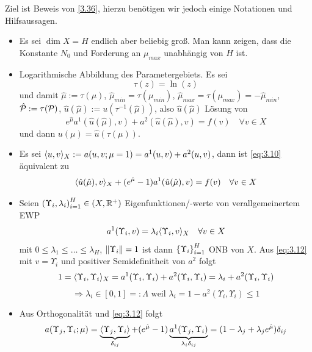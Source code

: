 Ziel ist Beweis von \ref{3.36}, hierzu benötigen wir jedoch einige Notationen und Hilfsaussagen.

\begin{itemize}
	\item Es sei $\dim X = H$ endlich aber beliebig groß.
		Man kann zeigen, dass die Konstante $N_0$ und Forderung an $\mu_{max}$ unabhängig von $H$ ist.
	\item Logarithmische Abbildung des Parametergebiets.
		Es sei
		\[
			\tau(z) = \ln(z)
		\]
		und damit $\hat\mu := \tau(\mu)$, $\hat\mu_{min} = \tau(\mu_{min})$, $\hat\mu_{max} = \tau(\mu_{max}) = -\hat\mu_{min}$, $\hat{\mathcal{P}} := \tau(\mathcal{P})$, $\hat u(\hat\mu) := u(\tau^{-1}(\hat\mu))$, also $\hat u(\hat\mu)$ Lösung von
		\begin{equation}
			e^{\hat\mu} a^1(\hat u(\hat\mu), v) + a^2(\hat u(\hat\mu), v) = f(v) \quad \forall v \in X \label{eq:3.10}
		\end{equation}
		und dann $u(\mu) = \hat u(\tau(\mu))$.
	\item Es sei $\langle u, v \rangle_X := a(u,v;\mu=1) = a^1(u,v) + a^2(u,v)$, dann ist \eqref{eq:3.10} äquivalent zu
		\begin{equation}
			\langle \hat u(\hat\mu), v \rangle_X + (e^{\hat\mu}-1) a^1(\hat u(\hat\mu),v) = f(v) \quad \forall v \in X \label{eq:3.11}
		\end{equation}
	\item Seien $\left(\Upsilon_i, \lambda_i\right)_{i=1}^H \in (X, \mathbb{R}^+)$ Eigenfunktionen/-werte von verallgemeinertem EWP
		\begin{equation}
			a^1(\Upsilon_i,v) = \lambda_i \langle \Upsilon_i, v \rangle_X \quad \forall v \in X \label{eq:3.12}
		\end{equation}
		mit $0 \leq \lambda_1 \leq \dots \leq \lambda_H$, $\|\Upsilon_i\| = 1$ ist dann $\left\{\Upsilon_i\right\}_{i=1}^H$ ONB von $X$.
		Aus \eqref{eq:3.12} mit $v = \Upsilon_i$ und positiver Semidefinitheit von $a^2$ folgt
		\[
			1 = \langle \Upsilon_i, \Upsilon_i \rangle_X = a^1(\Upsilon_i,\Upsilon_i) + a^2(\Upsilon_i,\Upsilon_i) = \lambda_i + a^2(\Upsilon_i,\Upsilon_i)
		\]
		\[
			\Rightarrow \lambda_i \in [0,1] =: \Lambda \text{ weil } \lambda_i = 1-a^2(\Upsilon_i,\Upsilon_i) \leq 1
		\]
	\item Aus Orthogonalität und \eqref{eq:3.12} folgt
		\begin{equation}
			a(\Upsilon_j,\Upsilon_i;\mu) = \underbrace{\langle \Upsilon_j, \Upsilon_i \rangle}_{\delta_{ij}} + (e^{\hat\mu}-1) \underbrace{a^1(\Upsilon_j,\Upsilon_i)}_{\lambda_i \delta_{ij}} = (1-\lambda_j+\lambda_j e^{\hat\mu}) \delta_{ij} \label{eq:3.13}
		\end{equation}
\end{itemize}

